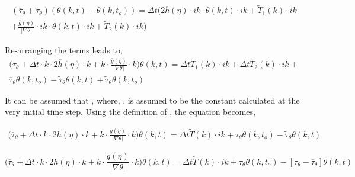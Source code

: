 \documentclass[a4paper,11pt,dvipsnames]{article}
\begin{document}
\begin{multline}
\left ( \overline{\tau}_\theta + \tilde{\tau}_\theta \right ) \left ( \theta (k,t) - \theta (k,t_o) \right ) = 
\Delta t \biggl ( 2 \overline{h} (\eta) \cdot ik \cdot \theta (k,t) \cdot ik +  \tilde{T}_1 (k) \cdot ik \\ 
+ \frac{\overline{g}(\eta)}{\left | \nabla \theta \right |} \cdot ik \cdot \theta (k,t) \cdot ik + 
\tilde{T}_2 (k) \cdot ik \biggr ) \label{eq:14}
\end{multline}

Re-arranging the terms leads to, 
\begin{multline}
\biggl ( \overline{\tau}_\theta + \Delta t \cdot k \cdot 2 \overline{h} (\eta) \cdot k 
+ k \cdot \frac{\overline{g}(\eta)}{\left | \nabla \theta \right |} \cdot k \biggr ) \theta (k,t) = 
\Delta t \tilde{T}_1 (k) \cdot ik + \Delta t \tilde{T}_2 (k) \cdot ik + \\
\overline{\tau}_\theta \theta (k,t_o) - \tilde{\tau}_\theta \theta (k,t) + \tilde{\tau}_\theta \theta (k,t_o) \label{eq:15}
\end{multline}

It can be assumed that , 
where, . 
 is assumed to be the constant 
 calculated at the very initial time step. 
Using the definition of \mathsym{\tau_\theta = \overline{\tau}_\theta + \tilde{\tau}_\theta}, the equation becomes, 

\begin{multline}
\biggl ( \overline{\tau}_\theta + \Delta t \cdot k \cdot 2 \overline{h} (\eta) \cdot k 
+ k \cdot \frac{\overline{g}(\eta)}{\left | \nabla \theta \right |} \cdot k \biggr ) \theta (k,t) = 
\Delta t \tilde{T}(k) \cdot ik + \tau_\theta \theta (k,t_o) - \tilde{\tau}_\theta \theta (k,t) \label{eq:16}
\end{multline}

\begin{equation}
\biggl ( \overline{\tau}_\theta + \Delta t \cdot k \cdot 2 \overline{h} (\eta) \cdot k 
+ k \cdot \frac{\overline{g}(\eta)}{\left | \nabla \theta \right |} \cdot k \biggr ) \theta (k,t) = 
\Delta t \tilde{T}(k) \cdot ik + \tau_\theta \theta (k,t_o) - 
\left [ \tau_\theta - \overline{\tau}_\theta \right ] \theta (k,t) \label{eq:17}
\end{equation}
\end{document}
